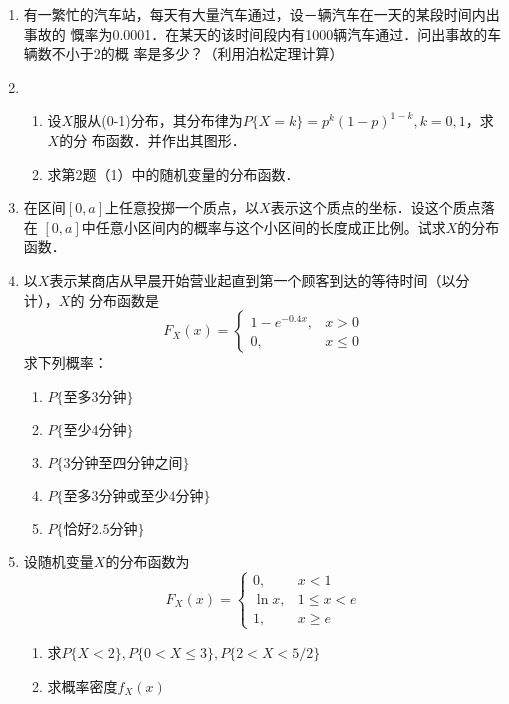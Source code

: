 \documentclass[10pt,a4paper]{article}
\begin{document}
\begin{enumerate}
    \item 有一繁忙的汽车站，每天有大量汽车通过，设－辆汽车在一天的某段时间内出事故的
    慨率为0.0001．在某天的该时间段内有1000辆汽车通过．问出事故的车辆数不小于2的概
    率是多少？（利用泊松定理计算）


    \item \begin{enumerate}
        \item 设$X$服从(0-1)分布，其分布律为$P\{X=k\}=p^k{(1-p)}^{1-k},k=0,1$，求$X$的分
        布函数．并作出其图形．
        \item 求第2题（1）中的随机变量的分布函数．
    \end{enumerate}


    \item 在区间$[0,a]$上任意投掷一个质点，以$X$表示这个质点的坐标．设这个质点落在
    $[0,a]$中任意小区间内的概率与这个小区间的长度成正比例。试求$X$的分布函数．


    \item 以$X$表示某商店从早晨开始营业起直到第一个顾客到达的等待时间（以分计），$X$的
    分布函数是
    $$F_X(x)=\left\{\begin{array}{ll}
        1-e^{-0.4x}, & x>0\\
        0, & x\leq 0
    \end{array}\right.$$
    求下列概率：
    \begin{enumerate}
        \item $P\{\mbox{至多3分钟}\}$
        \item $P\{\mbox{至少4分钟}\}$
        \item $P\{\mbox{3分钟至四分钟之间}\}$
        \item $P\{\mbox{至多3分钟或至少4分钟}\}$
        \item $P\{\mbox{恰好2.5分钟}\}$
    \end{enumerate}


    \item 设随机变量$X$的分布函数为
    $$F_X(x)=\left\{\begin{array}{ll}
        0, & x<1\\
        \ln x, & 1\leq x <e\\
        1, & x\geq e
    \end{array}\right.$$
    \begin{enumerate}
        \item 求$P\{X<2\},P\{0<X\leq 3\},P\{2<X<5/2\}$
        \item 求概率密度$f_X(x)$
    \end{enumerate}




\end{enumerate}
\end{document}
